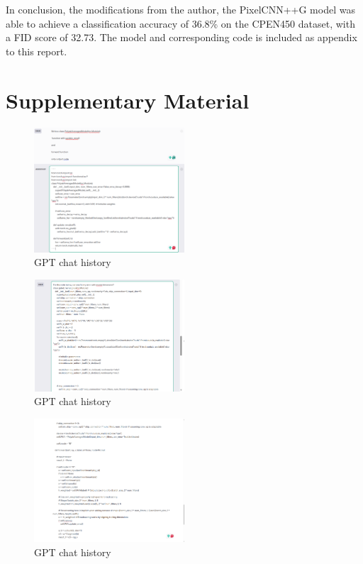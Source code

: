 \documentclass{article}
\begin{document}
In conclusion, the modifications from the author, the PixelCNN++G model was able to achieve a classification accuracy of 36.8\% on the CPEN450 dataset, with a FID score of 32.73. The model and corresponding code is included as appendix to this report.


\section{Supplementary Material}

\begin{figure}[H]
    \centering
    \includegraphics[width=0.5\textwidth]{report_data/g-1.png}
    \caption{GPT chat history}
\end{figure}


\begin{figure}
    \centering
    \includegraphics[width=0.5\textwidth]{report_data/g-2.png}
    \caption{GPT chat history}
\end{figure}


\begin{figure}
    \centering
    \includegraphics[width=0.5\textwidth]{report_data/g-3.png}
    \caption{GPT chat history}
\end{figure}
\end{document}
